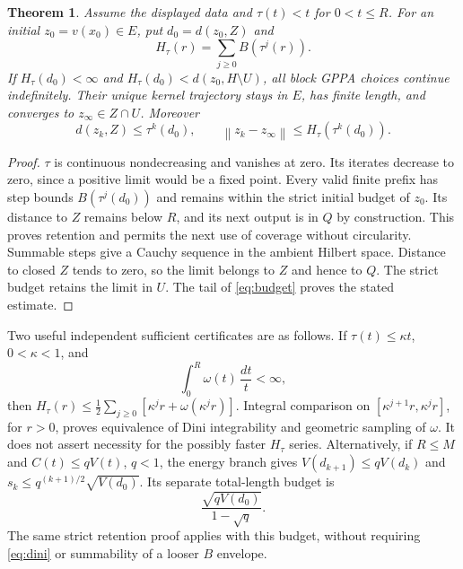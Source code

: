 \documentclass[11pt]{article}
\newcommand{\norm}[1]{\left\lVert#1\right\rVert}
\newtheorem{theorem}{Theorem}[section]
\theoremstyle{remark}
\begin{document}
\begin{theorem}\label{thm:main}
Assume the displayed data and $\tau(t)<t$ for $0<t\le R$. For an
initial $z_0=v(x_0)\in E$, put $d_0=d(z_0,Z)$ and
\begin{equation}\label{eq:budget}
 H_\tau(r)=\sum_{j\ge0}B(\tau^j(r)).
\end{equation}
If $H_\tau(d_0)<\infty$ and
$H_\tau(d_0)<d(z_0,H\setminus U)$, all block GPPA choices continue
indefinitely. Their unique kernel trajectory stays in $E$, has finite
length, and converges to $z_\infty\in Z\cap U$. Moreover
\begin{equation}
 d(z_k,Z)\le\tau^k(d_0),\qquad
 \norm{z_k-z_\infty}\le H_\tau(\tau^k(d_0)).
\end{equation}
\end{theorem}
\begin{proof}
$\tau$ is continuous nondecreasing and vanishes at zero. Its iterates
decrease to zero, since a positive limit would be a fixed point.
Every valid finite prefix has step bounds $B(\tau^j(d_0))$ and remains
within the strict initial budget of $z_0$. Its distance to $Z$ remains
below $R$, and its next output is in $Q$ by construction. This proves
retention and permits the next use of coverage without circularity.
Summable steps give a Cauchy sequence in the ambient Hilbert space.
Distance to closed $Z$ tends to zero, so the limit belongs to $Z$ and
hence to $Q$. The strict budget retains the limit in $U$. The tail of
\eqref{eq:budget} proves the stated estimate.
\end{proof}

Two useful independent sufficient certificates are as follows.
If $\tau(t)\le\kappa t$, $0<\kappa<1$, and
\begin{equation}\label{eq:dini}
 \int_0^R\omega(t)\,\frac{dt}{t}<\infty,
\end{equation}
then $H_\tau(r)\le\tfrac12\sum_{j\ge0}[\kappa^jr+\omega(\kappa^jr)]$.
Integral comparison on $[\kappa^{j+1}r,\kappa^jr]$, for $r>0$, proves
equivalence of Dini integrability and geometric sampling of $\omega$.
It does not assert necessity for the possibly faster $H_\tau$ series.
Alternatively, if $R\le M$ and $C(t)\le qV(t)$, $q<1$, the energy
branch gives $V(d_{k+1})\le qV(d_k)$ and
$s_k\le q^{(k+1)/2}\sqrt{V(d_0)}$. Its separate total-length budget is
\begin{equation}\label{eq:energybudget}
 \frac{\sqrt{qV(d_0)}}{1-\sqrt q}.
\end{equation}
The same strict retention proof applies with this budget, without
requiring \eqref{eq:dini} or summability of a looser $B$ envelope.
\end{document}
